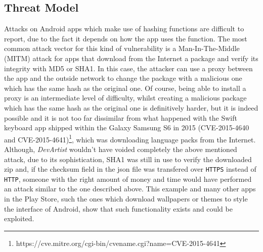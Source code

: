 \subsection{Threat Model}
Attacks on Android apps which make use of hashing functions are difficult to report, due to the fact it depends on how the app uses the function. The most common attack vector for this kind of vulnerability is a Man-In-The-Middle (MITM) attack for apps that download from the Internet a package and verify its integrity with MD5 or SHA1. In this case, the attacker can use a proxy between the app and the outside network to change the package with a malicious one which has the same hash as the original one. Of course, being able to install a proxy is an intermediate level of difficulty, whilst creating a malicious package which has the same hash as the original one is definitively harder, but it is indeed possible and it is not too far dissimilar from what happened with the Swift keyboard app shipped within the Galaxy Samsung S6 in 2015 (CVE-2015-4640 and CVE-2015-4641)\footnote{https://cve.mitre.org/cgi-bin/cvename.cgi?name=CVE-2015-4641}, which was downloading language packs from the Internet. Although, \emph{DevArtist} wouldn't have voided completely the above mentioned attack, due to its sophistication, SHA1 was still in use to verify the downloaded zip and, if the checksum field in the json file was transfered over \texttt{HTTPS} instead of \texttt{HTTP}, someone with the right amount of money and time would have performed an attack similar to the one described above. This example and many other apps in the Play Store, such the ones which download wallpapers or themes to style the interface of Android, show that such functionality exists and could be exploited. 

